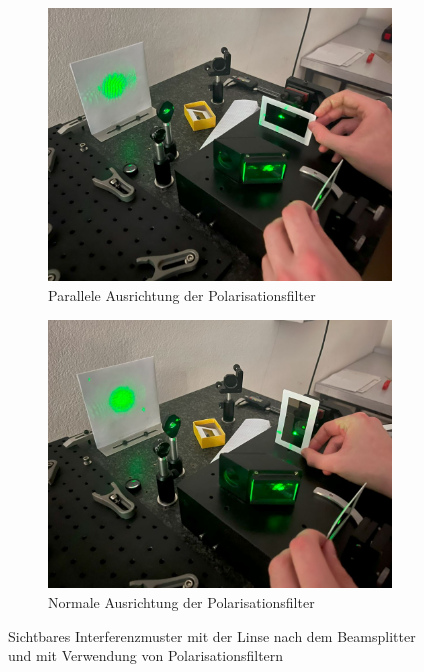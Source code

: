 \documentclass[12pt,english,ngerman]{scrartcl}
\begin{document}
\begin{figure}[H]
	\centering
	\begin{subfigure}{.45\linewidth}
		\includegraphics[width=\textwidth]{./figures/Interferometer_polarisation_parallel.JPG}
		\caption{Parallele Ausrichtung der Polarisationsfilter
		}\label{fig:interferometer_polarisation_parallel}
	\end{subfigure}
	\begin{subfigure}{.45\linewidth}
		\includegraphics[width=\textwidth]{./figures/Interferometer_polarisation_normal.JPG}
		\caption{Normale Ausrichtung der Polarisationsfilter
		}\label{fig:interferometer_polarisation_normal}
	\end{subfigure}
	\caption[Sichtbares Interferenzmuster mit der Linse nach dem Beamsplitter und mit
		Verwendung von Polarisationsfiltern] {Sichtbares Interferenzmuster mit der
		Linse nach dem Beamsplitter und mit Verwendung von Polarisationsfiltern
	}\label{fig:interferometer_polarisation}
\end{figure}
\end{document}
